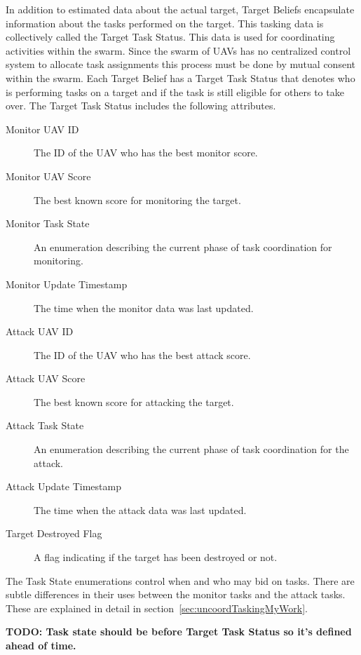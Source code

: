 \begin{multicols*}{2}


In addition to estimated data about the actual target, Target Beliefs encapsulate information about the tasks performed on the target.  This tasking data is collectively called the Target Task Status.  This data is used for coordinating activities within the swarm.  Since the swarm of UAVs has no centralized control system to allocate task assignments this process must be done by mutual consent within the swarm.  Each Target Belief has a Target Task Status that denotes who is performing tasks on a target and if the task is still eligible for others to take over.  The Target Task Status includes the following attributes.

\begin{description}
	\item [Monitor UAV ID] The ID of the UAV who has the best monitor score.
	\item [Monitor UAV Score] The best known score for monitoring the target.
	\item [Monitor Task State] An enumeration describing the current phase of task coordination for monitoring.
	\item [Monitor Update Timestamp] The time when the monitor data was last updated.
	\item [Attack UAV ID] The ID of the UAV who has the best attack score.
	\item [Attack UAV Score] The best known score for attacking the target.
	\item [Attack Task State] An enumeration describing the current phase of task coordination for the attack.
	\item [Attack Update Timestamp] The time when the attack data was last updated.
	\item [Target Destroyed Flag] A flag indicating if the target has been destroyed or not.
\end{description}

The Task State enumerations control when and who may bid on tasks.  There are subtle differences in their uses between the monitor tasks and the attack tasks.  These are explained in detail in  section~\ref{sec:uncoordTaskingMyWork}.

\textbf{TODO: Task state should be before Target Task Status so it's defined ahead of time.}


\end{multicols*}
